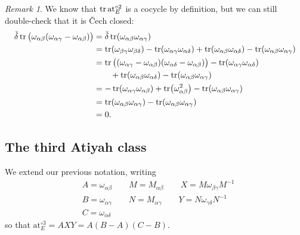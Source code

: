 \documentclass[11pt,fleqn]{article}
\theoremstyle{plain}
\theoremstyle{definition}
\theoremstyle{remark}
\newtheorem{remark}[theorem]{Remark}
\numberwithin{equation}{theorem}
\newcommand{\at}{\mathrm{at}}
\newcommand{\expat}[1]{\at^{\circ#1}}
\begin{document}
        \begin{remark}\label{remark:double-checking-at2-is-closed}
            We know that $\tr\expat{2}_E$ is a cocycle by definition, but we can still double-check that it is Čech closed:
            \begin{align*}
                \check\delta\tr\big(\omega_{\alpha\beta}(\omega_{\alpha\gamma}-\omega_{\alpha\beta})\big)
                &= \check\delta\tr(\omega_{\alpha\beta}\omega_{\alpha\gamma})
            \\  &= \tr(\omega_{\beta\gamma}\omega_{\beta\delta}) - \tr(\omega_{\alpha\gamma}\omega_{\alpha\delta}) + \tr(\omega_{\alpha\beta}\omega_{\alpha\delta}) - \tr(\omega_{\alpha\beta}\omega_{\alpha\gamma})
            \\  &= \tr\big((\omega_{\alpha\gamma}-\omega_{\alpha\beta})(\omega_{\alpha\delta}-\omega_{\alpha\beta})\big) - \tr(\omega_{\alpha\gamma}\omega_{\alpha\delta})
            \\  &\qquad + \tr(\omega_{\alpha\beta}\omega_{\alpha\delta}) - \tr(\omega_{\alpha\beta}\omega_{\alpha\gamma})
            \\  &= -\tr(\omega_{\alpha\gamma}\omega_{\alpha\beta}) + \tr(\omega_{\alpha\beta}^2) - \tr(\omega_{\alpha\beta}\omega_{\alpha\gamma})
            \\  &= \tr(\omega_{\alpha\beta}\omega_{\alpha\gamma}) - \tr(\omega_{\alpha\beta}\omega_{\alpha\gamma})
            \\  &= 0.
            \end{align*}
        \end{remark}


    \subsection{The third Atiyah class}\label{subsection:third-manual-atiyah-class}

        We extend our previous notation, writing
        \begin{align*}
            &A=\omega_{\alpha\beta} \qquad M=M_{\alpha\beta} \qquad X=M\omega_{\beta\gamma}M^{-1}\\
            &B=\omega_{\alpha\gamma} \qquad N=M_{\alpha\gamma} \qquad Y=N\omega_{\gamma\delta}N^{-1}\\
            &C=\omega_{\alpha\delta}
        \end{align*}
        so that $\expat{3}_E = AXY = A(B-A)(C-B)$.
\end{document}
